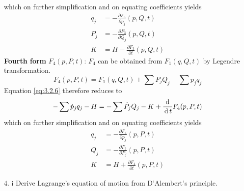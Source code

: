 \documentclass[12pt]{article}
\begin{document}
\begin{soln}
    which on further simplification and on equating coefficients yields
    \begin{align*}
        q_j&=-\frac{\partial F_3}{\partial p_j}(p,Q,t)\\
        P_j&=-\frac{\partial F_3}{\partial Q_j}(p,Q,t)\\
        K&=H+\frac{\partial F_3}{\partial t}(p,Q,t)
    \end{align*}
    \textbf{Fourth form} \(F_4(p,P,t)\):  \(F_4\) can be obtained from \(F_1(q,Q,t)\) by Legendre transformation.
    \[F_4(p,P,t)=F_1(q,Q,t)+\sum P_jQ_j-\sum p_jq_j\]
    Equation \eqref{eq:3.2.6} therefore reduces to
    \[-\sum \dot{p}_jq_j-H=-\sum \dot{P}_j{Q}_j-K+\frac{\,\mathrm{d}\,}{\,\mathrm{d}\, t}F_4(p,P,t)\]
    which on further simplification and on equating coefficients yields
    \begin{align*}
        q_j&=-\frac{\partial F_4}{\partial p_j}(p,P,t)\\
        Q_j&=-\frac{\partial F_3}{\partial P_j}(p,P,t)\\
        K&=H+\frac{\partial F_4}{\partial t}(p,P,t)
    \end{align*}
\end{soln}
\begin{prob}{4. i}
    Derive Lagrange's equation of motion from D'Alembert's principle.
\end{prob}
\end{document}

